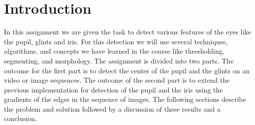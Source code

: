 \section{Introduction}
In this assignment we are given the task to detect various features of the eyes like the pupil, glints and iris. For this detection we will use several techniques, algorithms, and concepts we have learned in the course like thresholding, segmenting, and morphology. The assignment is divided into two parts. The outcome for the first part is to detect the center of the pupil and the glints on an video or image sequences. The outcome of the second part is to extend the previous implementation for detection of the pupil and the iris using the gradients of the edges in the sequence of images. The following sections describe the problem and solution followed by a discussion of these results and a conclusion.